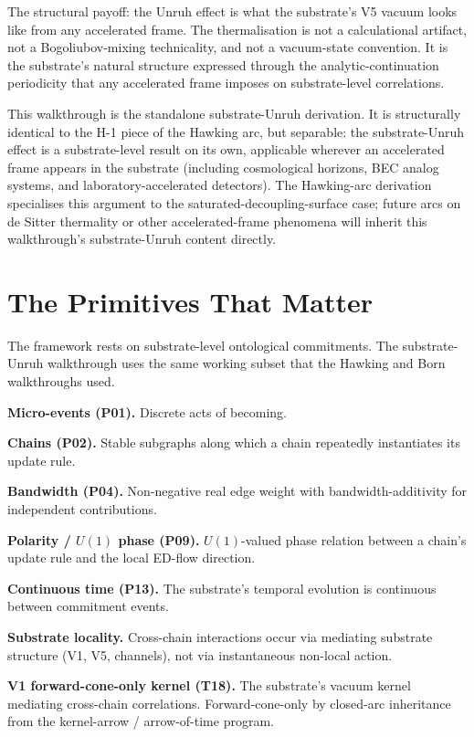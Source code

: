 \documentclass[11pt,a4paper]{article}
\begin{document}
The structural payoff: the Unruh effect is what the substrate's V5 vacuum looks like from any accelerated frame. The thermalisation is not a calculational artifact, not a Bogoliubov-mixing technicality, and not a vacuum-state convention. It is the substrate's natural structure expressed through the analytic-continuation periodicity that any accelerated frame imposes on substrate-level correlations.

This walkthrough is the standalone substrate-Unruh derivation. It is structurally identical to the H-1 piece of the Hawking arc, but separable: the substrate-Unruh effect is a substrate-level result on its own, applicable wherever an accelerated frame appears in the substrate (including cosmological horizons, BEC analog systems, and laboratory-accelerated detectors). The Hawking-arc derivation specialises this argument to the saturated-decoupling-surface case; future arcs on de Sitter thermality or other accelerated-frame phenomena will inherit this walkthrough's substrate-Unruh content directly.

\section{The Primitives That Matter}

The framework rests on substrate-level ontological commitments. The substrate-Unruh walkthrough uses the same working subset that the Hawking and Born walkthroughs used.

\textbf{Micro-events (P01).} Discrete acts of becoming.

\textbf{Chains (P02).} Stable subgraphs along which a chain repeatedly instantiates its update rule.

\textbf{Bandwidth (P04).} Non-negative real edge weight with bandwidth-additivity for independent contributions.

\textbf{Polarity / $U(1)$ phase (P09).} $U(1)$-valued phase relation between a chain's update rule and the local ED-flow direction.

\textbf{Continuous time (P13).} The substrate's temporal evolution is continuous between commitment events.

\textbf{Substrate locality.} Cross-chain interactions occur via mediating substrate structure (V1, V5, channels), not via instantaneous non-local action.

\textbf{V1 forward-cone-only kernel (T18).} The substrate's vacuum kernel mediating cross-chain correlations. Forward-cone-only by closed-arc inheritance from the kernel-arrow / arrow-of-time program.
\end{document}
